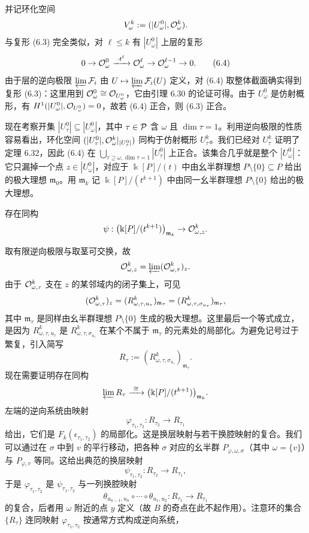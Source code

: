 并记环化空间
\[
  V^k_\omega:=(|U^0_\omega|,\mathcal{O}^k_\omega).
\]
与复形 (6.3) 完全类似，对 $\ell\le k$ 有 $|U^0_\omega|$ 上层的复形
\begin{equation}
  0\to\cO^0_\omega\xrightarrow{\ \cdot t^\ell\ }\cO^\ell_\omega
  \to\cO^{\ell-1}_\omega\to 0. \tag{6.4}
\end{equation}
由于层的逆向极限 $\varprojlim\mathcal{F}_i$ 由 $U\mapsto\varprojlim\mathcal{F}_i(U)$ 定义，对 (6.4) 取整体截面确实得到复形 (6.3)：这里用到 $\mathcal{O}^0_\omega\cong\mathcal{O}_{U^0_\omega}$，它由引理 6.30 的论证可得。由于 $U^0_\omega$ 是仿射概形，有 $H^1(|U^0_\omega|,\mathcal{O}_{U^0_\omega})=0$，故若 (6.4) 正合，则 (6.3) 正合。

现在考察开集 $|U^0_\tau|\subseteq|U^0_\omega|$，其中 $\tau\in\mathcal{P}$ 含 $\omega$ 且 $\dim\tau=1$。利用逆向极限的性质容易看出，环化空间 $(|U^0_\tau|,\mathcal{O}^k_\omega|_{|U^0_\tau|})$ 同构于仿射概形 $U^k_\tau$。我们已经对 $U^k_\tau$ 证明了定理 6.32，因此 (6.4) 在 $\bigcup_{\tau\supseteq\omega,\dim\tau=1}|U^0_\tau|$ 上正合。该集合几乎就是整个 $|U^0_\omega|$：它只漏掉一个点 $z\in|U^0_\omega|$，对应于 $\Bbbk[P]/(t)$ 中由幺半群理想 $P\setminus\{0\}\subseteq P$ 给出的极大理想 $\mathfrak m_0$。用 $\mathfrak m_k$ 记 $\Bbbk[P]/(t^{k+1})$ 中由同一幺半群理想 $P\setminus\{0\}$ 给出的极大理想。

\begin{lemma}
存在同构
\[
  \psi:\bigl(\Bbbk[P]/(t^{k+1})\bigr)_{\mathfrak m_k}\to\mathcal{O}^k_{\omega,z}.
\]
\end{lemma}

取有限逆向极限与取茎可交换，故
\[
  \mathcal{O}^k_{\omega,z}=\varprojlim(\mathcal{O}^k_{\omega,\tau})_z.
\]
由于 $\mathcal{O}^k_{\omega,\tau}$ 支在 $z$ 的某邻域内的闭子集上，可见
\[
  (\mathcal{O}^k_{\omega,\tau})_z=(R^k_{\omega,\tau,u_\tau})_{\mathfrak m_\tau}
  =(R^k_{\omega,\tau,\sigma_{u_\tau}})_{\mathfrak m_\tau},
\]
其中 $\mathfrak m_\tau$ 是同样由幺半群理想 $P\setminus\{0\}$ 生成的极大理想。这里最后一个等式成立，是因为 $R^k_{\omega,\tau,u_\tau}$ 是 $R^k_{\omega,\tau,\sigma_{u_\tau}}$ 在某个不属于 $\mathfrak m_\tau$ 的元素处的局部化。为避免记号过于繁复，引入简写
\[
  R_\tau:=(R^k_{\omega,\tau,\sigma_{u_\tau}})_{\mathfrak m_\tau}.
\]
现在需要证明存在同构
\[
  \varprojlim R_\tau\xrightarrow{\ \cong\ }\bigl(\Bbbk[P]/(t^{k+1})\bigr)_{\mathfrak m_k}.
\]
左端的逆向系统由映射
\[
  \varphi_{\tau_1,\tau_2}:R_{\tau_2}\to R_{\tau_1}
\]
给出，它们是 $F_k(\epsilon_{\tau_1,\tau_2})$ 的局部化。这是换层映射与若干换腔映射的复合。我们可以通过在 $\sigma$ 中到 $v$ 的平行移动，把各种 $\sigma$ 对应的幺半群 $P_{\varphi,\omega,\sigma}$（其中 $\omega=\{v\}$）与 $P_{\varphi,v}$ 等同。这给出典范的换层映射
\[
  \psi_{\tau_1,\tau_2}:R_{\tau_2}\to R_{\tau_1},
\]
于是 $\varphi_{\tau_1,\tau_2}$ 是 $\psi_{\tau_1,\tau_2}$ 与一列换腔映射
\[
  \theta_{u_{n-1},u_n}\circ\cdots\circ\theta_{u_1,u_2}:R_{\tau_1}\to R_{\tau_1}
\]
的复合，后者用 $\omega$ 附近的点 $y$ 定义（故 $B$ 的奇点在此不起作用）。注意环的集合 $\{R_\tau\}$ 连同映射 $\varphi_{\tau_1,\tau_2}$ 按通常方式构成逆向系统，


